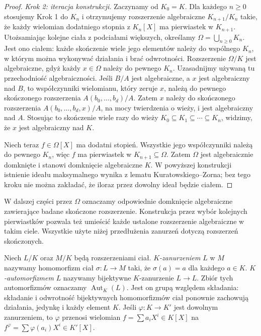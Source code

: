 \begin{proof}
\emph{Krok 2: iteracja konstrukcji.}
Zaczynamy od $K_0=K$. Dla każdego $n\ge0$ stosujemy
Krok 1 do $K_n$ i otrzymujemy rozszerzenie algebraiczne
$K_{n+1}/K_n$ takie, że każdy wielomian dodatniego
stopnia z $K_n[X]$ ma pierwiastek w $K_{n+1}$.
Utożsamiając kolejne ciała z podciałami większych,
określamy $\Omega=\bigcup_{n\ge0}K_n$.
Jest ono ciałem: każde skończenie wiele jego elementów
należy do wspólnego $K_n$, w którym można wykonywać
działania i brać odwrotności. Rozszerzenie $\Omega/K$
jest algebraiczne, gdyż każdy $x\in\Omega$ należy
do pewnego $K_n$. Uzasadnijmy używaną tu
przechodniość algebraiczności. Jeśli $B/A$ jest
algebraiczne, a $x$ jest algebraiczny nad $B$,
to współczynniki wielomianu, który zeruje $x$,
należą do pewnego skończonego rozszerzenia
$A(b_0,\ldots,b_d)/A$. Zatem $x$ należy do skończonego
rozszerzenia $A(b_0,\ldots,b_d,x)/A$, na mocy
twierdzenia o wieży, i jest algebraiczny nad $A$.
Stosując to skończenie wiele razy do wieży
$K_0\subseteq K_1\subseteq\cdots\subseteq K_n$,
widzimy, że $x$ jest algebraiczny nad $K$.

Niech teraz $f\in\Omega[X]$ ma dodatni stopień.
Wszystkie jego współczynniki należą do pewnego $K_n$,
więc $f$ ma pierwiastek w $K_{n+1}\subseteq\Omega$.
Zatem $\Omega$ jest algebraicznie domknięte i stanowi
domknięcie algebraiczne $K$.
W powyższej konstrukcji istnienie ideału maksymalnego wynika
z lematu Kuratowskiego--Zorna; bez tego kroku nie można zakładać,
że iloraz przez dowolny ideał będzie ciałem.
\end{proof}

W dalszej części przez $\Omega$ oznaczamy odpowiednie
domknięcie algebraiczne zawierające badane skończone
rozszerzenie. Konstrukcja przez wybór kolejnych pierwiastków
pozwala też umieścić każde ustalone rozszerzenie algebraiczne
w takim ciele. Wszystkie użyte niżej przedłużenia zanurzeń
dotyczą rozszerzeń skończonych.

\begin{definicja}
\label{aa:def:field-k-embedding}
Niech $L/K$ oraz $M/K$ będą rozszerzeniami ciał.
\emph{$K$-zanurzeniem} $L$ w $M$ nazywamy homomorfizm
ciał $\sigma:L\to M$ taki, że $\sigma(a)=a$ dla każdego $a\in K$.
\emph{$K$-automorfizmem} $L$ nazywamy bijektywne $K$-zanurzenie
$L\to L$. Zbiór tych automorfizmów oznaczamy
$\operatorname{Aut}_K(L)$. Jest on grupą względem składania:
składanie i odwrotność bijektywnych homomorfizmów ciał
ponownie zachowują działania, jedynkę i każdy element $K$.
Jeśli $\varphi:K\to K'$ jest dowolnym zanurzeniem, to
$\varphi$ przenosi wielomian $f=\sum a_iX^i\in K[X]$
na $f^\varphi=\sum\varphi(a_i)X^i\in K'[X]$.
\end{definicja}

